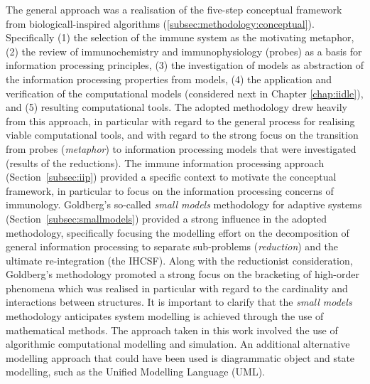 The general approach was a realisation of the five-step conceptual framework from biologicall-inspired algorithms (\ref{subsec:methodology:conceptual}). Specifically (1) the selection of the immune system as the motivating metaphor, (2) the review of immunochemistry and immunophysiology (probes) as a basis for information processing principles, (3) the investigation of models as abstraction of the information processing properties from models, (4) the application and verification of the computational models (considered next in Chapter \ref{chap:iidle}), and (5) resulting computational tools. The adopted methodology drew heavily from this approach, in particular with regard to the general process for realising viable computational tools, and with regard to the strong focus on the transition from probes (\emph{metaphor}) to information processing models that were investigated (results of the reductions).
The immune information processing approach (Section~\ref{subsec:iip}) provided a specific context to motivate the conceptual framework, in particular to focus on the information processing concerns of immunology.
Goldberg's so-called \emph{small models} methodology for adaptive systems (Section~\ref{subsec:smallmodels}) provided a strong influence in the adopted methodology, specifically focusing the modelling effort on the decomposition of general information processing to separate sub-problems (\emph{reduction}) and the ultimate re-integration (the IHCSF). Along with the reductionist consideration, Goldberg's methodology promoted a strong focus on the bracketing of high-order phenomena which was realised in particular with regard to the cardinality and interactions between structures.
It is important to clarify that the \emph{small models} methodology anticipates system modelling is achieved through the use of mathematical methods. The approach taken in this work involved the use of algorithmic computational modelling and simulation. An additional alternative modelling approach that could have been used is diagrammatic object and state modelling, such as the Unified Modelling Language (UML).


%
%

